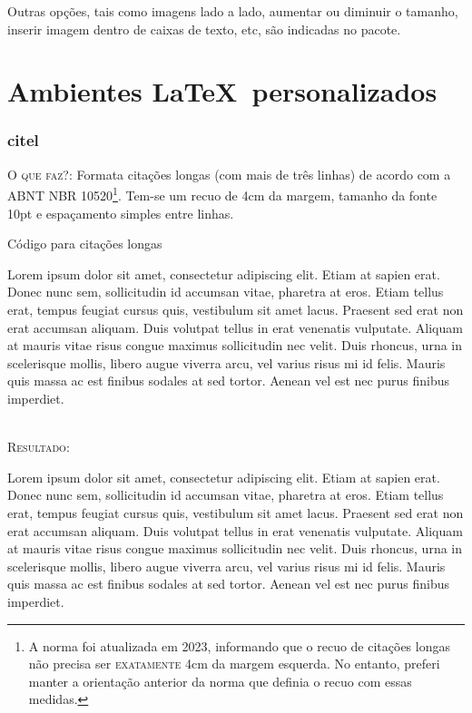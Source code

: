 \documentclass[a4paper,12pt,oneside,openright,extrafontsizes,openbib]{memoir}
\begin{document}
{Outras opções, tais como imagens lado a lado, aumentar ou diminuir o tamanho, inserir imagem dentro de caixas de texto, etc, são indicadas no pacote.

\chapter{Ambientes \LaTeX\ personalizados}

\subsection{citel}

\textsc{O que faz?}: Formata citações longas (com mais de três linhas) de acordo com a ABNT NBR 10520\footnote{A norma foi atualizada em 2023, informando que o recuo de citações longas não precisa ser \textsc{exatamente} 4cm da margem esquerda. No entanto, preferi manter a orientação anterior da norma que definia o recuo com essas medidas.}. Tem-se um recuo de 4cm da margem, tamanho da fonte 10pt e espaçamento simples entre linhas.
\ \\

\begin{codex}{Código para citações longas}
	\begin{citel}
		Lorem ipsum dolor sit amet, consectetur adipiscing elit. Etiam at sapien erat. Donec nunc sem, sollicitudin id accumsan vitae, pharetra at eros. Etiam tellus erat, tempus feugiat cursus quis, vestibulum sit amet lacus. Praesent sed erat non erat accumsan aliquam. Duis volutpat tellus in erat venenatis vulputate. Aliquam at mauris vitae risus congue maximus sollicitudin nec velit. Duis rhoncus, urna in scelerisque mollis, libero augue viverra arcu, vel varius risus mi id felis. Mauris quis massa ac est finibus sodales at sed tortor. Aenean vel est nec purus finibus imperdiet.
	\end{citel}
\end{codex}
\ \\

\textsc{Resultado:}
\ \\

\begin{citel}
	Lorem ipsum dolor sit amet, consectetur adipiscing elit. Etiam at sapien erat. Donec nunc sem, sollicitudin id accumsan vitae, pharetra at eros. Etiam tellus erat, tempus feugiat cursus quis, vestibulum sit amet lacus. Praesent sed erat non erat accumsan aliquam. Duis volutpat tellus in erat venenatis vulputate. Aliquam at mauris vitae risus congue maximus sollicitudin nec velit. Duis rhoncus, urna in scelerisque mollis, libero augue viverra arcu, vel varius risus mi id felis. Mauris quis massa ac est finibus sodales at sed tortor. Aenean vel est nec purus finibus imperdiet.
\end{citel}

}
\end{document}
